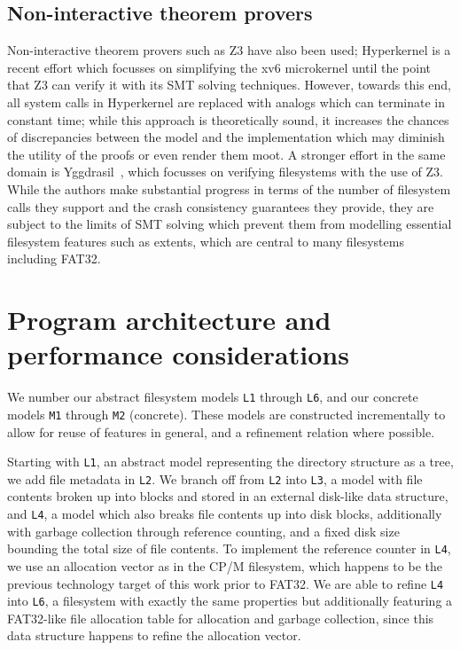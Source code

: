 \documentclass[submission,copyright,creativecommons]{eptcs}
\begin{document}
\subsection{Non-interactive theorem provers}
Non-interactive theorem provers such as Z3 \cite{de2008z3}
have also been used; Hyperkernel
\cite{Nelson:2017:HPV:3132747.3132748} is a recent effort which
focusses on simplifying the xv6 microkernel until the point that Z3
can verify it with its SMT solving techniques. However, towards this
end, all system calls in Hyperkernel are replaced with analogs which
can terminate in constant time; while this approach is theoretically
sound, it increases the chances of discrepancies between the model and
the implementation which may diminish the utility of the proofs or
even render them moot. A stronger effort in the same domain is
Yggdrasil~\cite{sigurbjarnarson2016push}, which focusses on verifying
filesystems with the use of Z3. While the authors make substantial
progress in terms of the number of filesystem calls they support and
the crash consistency guarantees they provide, they are subject to
the limits of SMT solving which prevent them from modelling essential
filesystem features such as extents, which are central to many
filesystems including FAT32.

\section{Program architecture and performance considerations}

We number our abstract filesystem models \texttt{L1} through
\texttt{L6}, and our concrete models \texttt{M1} through \texttt{M2}
(concrete). These models are constructed incrementally to allow for
reuse of features in general, and a refinement relation where
possible.

Starting with \texttt{L1}, an abstract model representing the directory
structure as a tree, we add file
metadata in \texttt{L2}. We branch off from \texttt{L2} into
\texttt{L3}, a model with file contents broken up into blocks and
stored in an external disk-like data structure, and \texttt{L4}, a
model which also breaks file contents up into disk blocks,
additionally with garbage collection through reference counting, and a
fixed disk size bounding the total size of file contents. To implement
the reference counter in \texttt{L4}, we use an allocation vector as
in the CP/M filesystem, which happens to be the previous technology
target of this work prior to FAT32. We are able to refine \texttt{L4}
into \texttt{L6}, a filesystem with exactly the same properties but
additionally featuring a FAT32-like file allocation table for
allocation and garbage collection, since this data structure happens
to refine the allocation vector.
\end{document}
